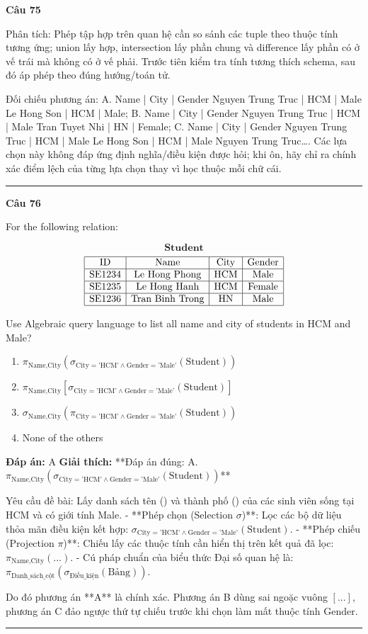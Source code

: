 \documentclass[11pt,a4paper]{article}
\newenvironment{question}[1]{%
  \par\vspace{1em}\noindent\textbf{\large Câu #1}\par\vspace{0.4em}
}{%
  \par\vspace{1em}\hrule\vspace{0.6em}
}
\newenvironment{choices}{%
  \begin{enumerate}[label=\textbf{\Alph*.},leftmargin=2.2em,itemsep=2pt,topsep=3pt]
}{%
  \end{enumerate}
}
\newcommand{\choice}{\item}
\begin{document}
\begin{question}{75}
Phân tích: Phép tập hợp trên quan hệ cần so sánh các tuple theo thuộc tính tương ứng; union lấy hợp, intersection lấy phần chung và difference lấy phần có ở vế trái mà không có ở vế phải. Trước tiên kiểm tra tính tương thích schema, sau đó áp phép theo đúng hướng/toán tử.

Đối chiếu phương án: A. Name | City | Gender Nguyen Trung Truc | HCM | Male Le Hong Son | HCM | Male; B. Name | City | Gender Nguyen Trung Truc | HCM | Male Tran Tuyet Nhi | HN | Female; C. Name | City | Gender Nguyen Trung Truc | HCM | Male Le Hong Son | HCM | Male Nguyen Trung Truc…. Các lựa chọn này không đáp ứng định nghĩa/điều kiện được hỏi; khi ôn, hãy chỉ ra chính xác điểm lệch của từng lựa chọn thay vì học thuộc mỗi chữ cái.
\end{question}

\begin{question}{76}
For the following relation:

\[\textbf{Student}\]
\[\begin{array}{|c|c|c|c|}
\hline
\text{ID} & \text{Name} & \text{City} & \text{Gender} \\
\hline
\text{SE1234} & \text{Le Hong Phong} & \text{HCM} & \text{Male} \\
\hline
\text{SE1235} & \text{Le Hong Hanh} & \text{HCM} & \text{Female} \\
\hline
\text{SE1236} & \text{Tran Binh Trong} & \text{HN} & \text{Male} \\
\hline
\end{array}\]

Use Algebraic query language to list all name and city of students in HCM and Male?
\begin{choices}
\choice \(\pi_{\text{Name}, \text{City}}(\sigma_{\text{City}=\text{'HCM'} \land \text{Gender}=\text{'Male'}}(\text{Student}))\)
\choice \(\pi_{\text{Name}, \text{City}}[\sigma_{\text{City}=\text{'HCM'} \land \text{Gender}=\text{'Male'}}(\text{Student})]\)
\choice \(\sigma_{\text{Name}, \text{City}}(\pi_{\text{City}=\text{'HCM'} \land \text{Gender}=\text{'Male'}}(\text{Student}))\)
\choice None of the others
\end{choices}
\textbf{Đáp án:} A
\textbf{Giải thích:} **Đáp án đúng: A. \(\pi_{\text{Name}, \text{City}}(\sigma_{\text{City}=\text{'HCM'} \land \text{Gender}=\text{'Male'}}(\text{Student}))\)**

Yêu cầu đề bài: Lấy danh sách tên () và thành phố () của các sinh viên sống tại HCM và có giới tính Male.
- **Phép chọn (Selection \(\sigma\))**: Lọc các bộ dữ liệu thỏa mãn điều kiện kết hợp: \(\sigma_{\text{City}=\text{'HCM'} \land \text{Gender}=\text{'Male'}}(\text{Student})\).
- **Phép chiếu (Projection \(\pi\))**: Chiếu lấy các thuộc tính cần hiển thị trên kết quả đã lọc: \(\pi_{\text{Name}, \text{City}}(...)\).
- Cú pháp chuẩn của biểu thức Đại số quan hệ là: \(\pi_{\text{Danh_sách_cột}}(\sigma_{\text{Điều_kiện}}(\text{Bảng}))\).

Do đó phương án **A** là chính xác. Phương án B dùng sai ngoặc vuông \([...]\), phương án C đảo ngược thứ tự chiếu trước khi chọn làm mất thuộc tính \(\text{Gender}\).
\end{question}
\end{document}
